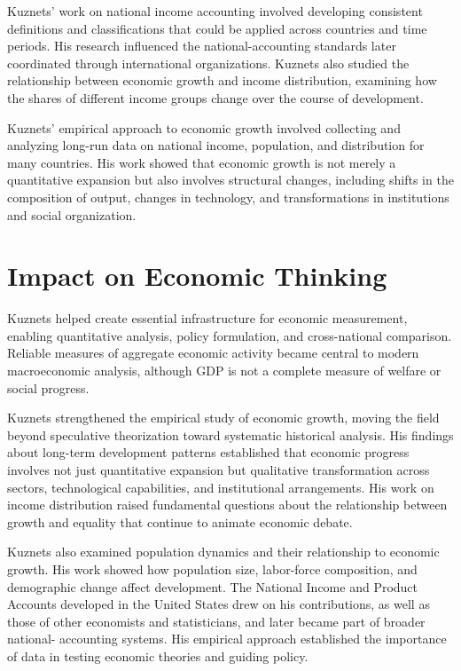 Kuznets' work on national income accounting involved developing consistent definitions and
classifications that could be applied across countries and time periods. His research influenced
the national-accounting standards later coordinated through international organizations. Kuznets
also studied the relationship between economic growth and income distribution, examining how the
shares of different income groups change over the course of development.

Kuznets' empirical approach to economic growth involved collecting and analyzing long-run data
on national income, population, and distribution for many countries. His work showed that economic
growth is not merely a quantitative expansion but also involves structural changes, including
shifts in the composition of output, changes in technology, and transformations in institutions
and social organization.

\section{Impact on Economic Thinking}
Kuznets helped create essential infrastructure for economic measurement, enabling quantitative
analysis, policy formulation, and cross-national comparison. Reliable measures of aggregate
economic activity became central to modern macroeconomic analysis, although GDP is not a complete
measure of welfare or social progress.

Kuznets strengthened the empirical study of economic growth, moving the field beyond speculative
theorization toward systematic historical analysis. His findings about long-term
development patterns established that economic progress involves not just quantitative expansion
but qualitative transformation across sectors, technological capabilities, and institutional
arrangements. His work on income distribution raised fundamental questions about the relationship
between growth and equality that continue to animate economic debate.

Kuznets also examined population dynamics and their relationship to economic growth. His work
showed how population size, labor-force composition, and demographic change affect development.
The National Income and Product Accounts developed in the United States drew on his contributions,
as well as those of other economists and statisticians, and later became part of broader national-
accounting systems. His empirical approach established the importance of data in testing economic
theories and guiding policy.

